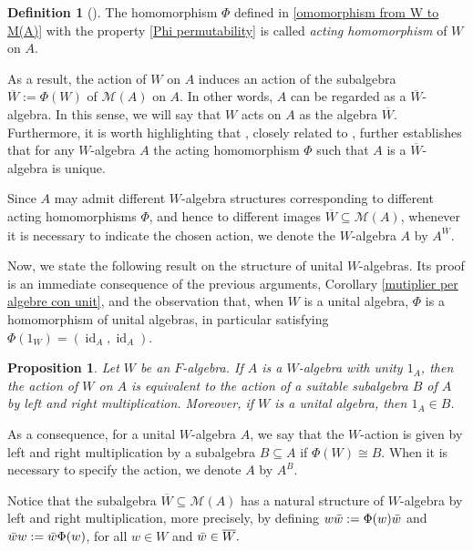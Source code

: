 \documentclass[reqno]{amsart}
\newtheorem{proposition}[theorem]{Proposition}
\theoremstyle{definition}
\newtheorem{definition}[theorem]{Definition}
\numberwithin{equation}{section}
\numberwithin{theorem}{section}
\DeclareMathOperator{\id}{id}
\newcommand{\M}{\mathcal{M}}
\begin{document}
\begin{definition}[{\cite{Janelidze2022}}]
    The homomorphism $\Phi$ defined in \eqref{omomorphism from W to M(A)} with the property \eqref{Phi permutability} is called \emph{acting homomorphism} of $W$ on $A.$
\end{definition}

As a result, the action of $W$ on $A$ induces an action of the subalgebra $\overline{W}:=\Phi(W)$ of $\M(A)$ on $A.$ In other words, $A$  can be regarded as a $\overline{W}$-algebra. In this sense, we will say that $W$ acts on $A$ as the algebra $\overline{W}.$ 
 Furthermore, it is worth highlighting that \cite[Proposition 1.11]{BroxGarciaMancini2024}, closely related to \cite[Proposition 4.5]{Janelidze2022}, further establishes that for any $W$-algebra $A$ the acting homomorphism $\Phi$ such that $A$ is a $\overline{W}$-algebra is unique.


Since $A$ may admit different $W$-algebra structures corresponding to different acting homomorphisms $\Phi$, and hence to different images $\overline{W}\subseteq \M(A)$, whenever it is necessary to indicate the chosen action, we denote the $W$-algebra $A$ by $A^{\overline{W}}$.




\smallskip



Now, we state the following result on the structure of unital $W$-algebras. Its proof is an immediate consequence of the previous arguments, Corollary \ref{mutiplier per algebre con unit}, and the observation that, when $W$ is a unital algebra, $\Phi$ is a homomorphism of unital algebras, in particular satisfying $\Phi(1_W) = (\id_A, \id_A).$


\begin{proposition}\label{Wazioni per algebre con unit}
    Let $W$ be an $F$-algebra. If $A$ is a $W$-algebra with unity $1_A$, then the action of $W$ on $A$ is equivalent to the action of a suitable subalgebra $B$ of $A$ by left and right multiplication. Moreover, if $W$ is a unital algebra, then $1_A\in B$.
\end{proposition}


As a consequence, for a unital $W$-algebra $A$, we say that the $W$-action is given by left and right multiplication by a subalgebra $B\subseteq A$ if $\Phi(W)\cong B$. When it is necessary to specify the action, we denote $A$ by $A^B$. 


\smallskip

Notice that the subalgebra $\overline{W}\subseteq \M(A)$ has a natural structure of $W$-algebra by left and right multiplication, more precisely, by defining $w\Bar{w}:=\Phi(w)\Bar{w}$ and $\Bar{w}w:=\Bar{w}\Phi(w)$, for all $w\in W$ and $\Bar{w}\in \overline{W}.$ 
\end{document}
